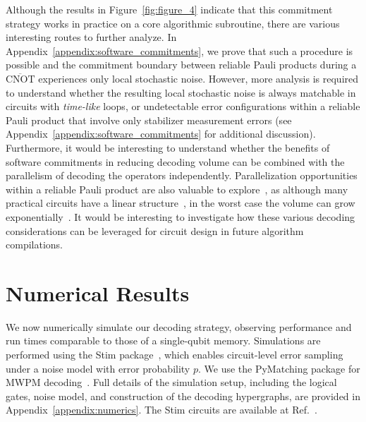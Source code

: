 \documentclass[prx,twocolumn,secnumarabic,balancelastpage,amsmath,amssymb,longbibliography]{revtex4-2}
\newcommand{\lcnot}{\overline{\text{CNOT}}}
\begin{document}
Although the results in Figure~\ref{fig:figure_4} indicate that this commitment strategy works in practice on a core algorithmic subroutine, there are various interesting routes to further analyze. 
%
In Appendix~\ref{appendix:software_commitments}, we prove that such a procedure is possible and the commitment boundary between reliable Pauli products during a $\lcnot$ experiences only local stochastic noise. 
%
However, more analysis is required to understand whether the resulting local stochastic noise is always matchable in circuits with \textit{time-like} loops, or undetectable error configurations within a reliable Pauli product that involve only stabilizer measurement errors (see Appendix~\ref{appendix:software_commitments} for additional discussion).
%
Furthermore, it would be interesting to understand whether the benefits of software commitments in reducing decoding volume can be combined with the parallelism of decoding the operators independently. 
%
Parallelization opportunities within a reliable Pauli product are also valuable to explore~\cite{fowler2015minimum,wu2023fusion}, as although many practical circuits have a linear structure~\cite{cuccaro2004new, babbush2018encoding,fowler2018low, haah2023quantum, zhou2025resource}, 
in the worst case the volume can grow exponentially~\cite{sahay2024error}.
%
It would be interesting to investigate how 
these various decoding considerations can be leveraged for circuit design in future algorithm compilations.

\section{Numerical Results}
\label{sec:numerics}
We now numerically simulate our decoding strategy, observing performance and run times comparable to those of a single-qubit memory.
%
Simulations are performed using the Stim package~\cite{gidney2021stim}, which enables circuit-level error sampling under a noise model with error probability $p$.
%
We use the PyMatching package for MWPM decoding~\cite{higgott2025sparse}.
%
Full details of the simulation setup, including the logical gates, noise model, and construction of the decoding hypergraphs, are provided in Appendix~\ref{appendix:numerics}.
%
The Stim circuits are available at Ref.~\cite{cain2025zenodo}.
\end{document}
